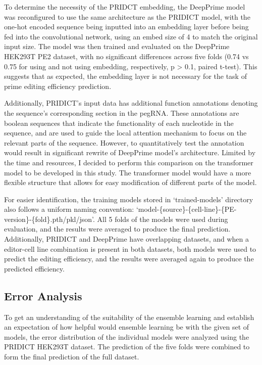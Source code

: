 To determine the necessity of the PRIDCT embedding, the DeepPrime model was reconfigured to use the same architecture as the PRIDICT model, with the one-hot encoded sequence being inputted into an embedding layer before being fed into the convolutional network, using an embed size of 4 to match the original input size. The model was then trained and evaluated on the DeepPrime HEK293T PE2 dataset, with no significant differences across five folds (0.74 vs 0.75 for using and not using embedding, respectively, p > 0.1, paired t-test). This suggests that as expected, the embedding layer is not necessary for the task of prime editing efficiency prediction.

Additionally, PRIDICT's input data has additional function annotations denoting the sequence's corresponding section in the pegRNA. These annotations are boolean sequences that indicate the functionality of each nucleotide in the sequence, and are used to guide the local attention mechanism to focus on the relevant parts of the sequence. However, to quantitatively test the annotation would result in significant rewrite of DeepPrime model's architecture. Limited by the time and resources, I decided to perform this comparison on the transformer model to be developed in this study. The transformer model would have a more flexible structure that allows for easy modification of different parts of the model. 

For easier identification, the training models stored in `trained-models' directory also follows a uniform naming convention: `model-\{source\}-\{cell-line\}-\{PE-version\}-\{fold\}.pth/pkl/json'. All 5 folds of the models were used during evaluation, and the results were averaged to produce the final prediction. Additionally, PRIDICT and DeepPrime have overlapping datasets, and when a editor-cell line combination is present in both datasets, both models were used to predict the editing efficiency, and the results were averaged again to produce the predicted efficiency.


\subsection{Error Analysis}

To get an understanding of the suitability of the ensemble learning and establish an expectation of how helpful would ensemble learning be with the given set of models, the error distribution of the individual models were analyzed using the PRIDICT HEK293T dataset. The prediction of the five folds were combined to form the final prediction of the full dataset.

